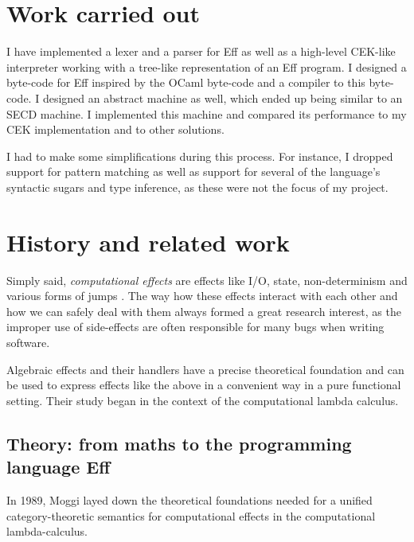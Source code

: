 \documentclass[class=article,crop=false,11pt]{standalone}
\begin{document}
\section{Work carried out}

I have implemented
a lexer and a parser for Eff as well as a high-level CEK-like interpreter working with
a tree-like representation of an Eff program. I designed a byte-code for Eff inspired
by the OCaml byte-code and a compiler to this byte-code. I designed an abstract machine
as well, which ended up being similar to an SECD machine. I implemented this machine and
compared its performance to my CEK implementation and to other solutions.

I had to make some simplifications during this process.
For instance, I dropped support for pattern matching as well as support for
several of the language's syntactic sugars and type inference, as these were not the focus of my project.

\section{History and related work}

Simply said, \emph{computational effects} are effects like I/O, state, non-determinism
and  various forms of jumps \cite{plotkin2002computational}. The way how these
effects interact with each other and how we can safely deal with them always formed a
great research interest, as the improper use of side-effects are often responsible for
many bugs when writing software.


Algebraic effects and their handlers have a precise theoretical foundation and can be
used to express effects like the above in a convenient way in a pure functional setting.
Their study began in the context of the computational lambda calculus.

\subsection{Theory: from maths to the programming language Eff}


In 1989, Moggi \cite{moggi1989computational,moggi1990abstract} layed down the theoretical foundations
needed for a unified category-theoretic semantics for computational effects in the computational lambda-calculus.
\end{document}
